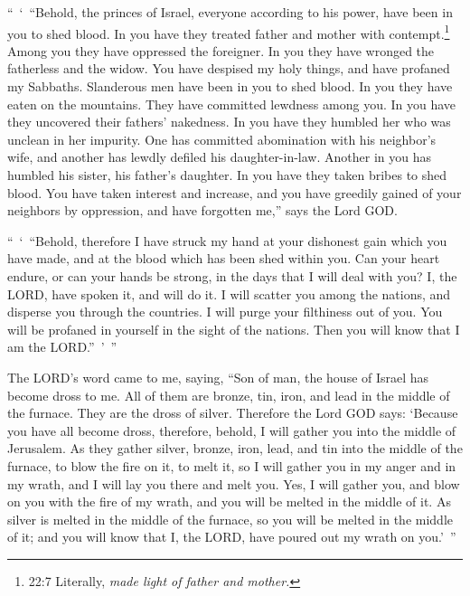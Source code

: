 \myverse{}“ ‘ “Behold, the princes of Israel, everyone according to his power,
have been in you to shed blood.
\myverse{}In you have they treated father and mother with contempt.\footnote{22:7 Literally,
	\textit{made light of father and mother.}} Among you they have oppressed the foreigner. In you
they have wronged the fatherless and the widow.
\myverse{}You have despised my holy things, and have profaned my Sabbaths.
\myverse{}Slanderous men have been in you to shed blood. In you they have eaten on the
mountains. They have committed lewdness among you.
\myverse{}In you have they uncovered their fathers’ nakedness. In you have they humbled
her who was unclean in her impurity.
\myverse{}One has committed abomination with his neighbor’s wife, and another has lewdly
defiled his daughter-in-law. Another in you has humbled his sister, his father’s daughter.
\myverse{}In you have they taken bribes to shed blood. You have taken interest and
increase, and you have greedily gained of your neighbors by oppression, and have forgotten me,” says the
Lord GOD.


\myverse{}“ ‘ “Behold, therefore I have struck my hand at your dishonest
gain which you have made, and at the blood which has been shed within you.
\myverse{}Can your heart endure, or can your hands be strong, in the days that I will
deal with you? I, the LORD, have spoken it, and will do it.
\myverse{}I will scatter you among the nations, and disperse you through the countries.
I will purge your filthiness out of you.
\myverse{}You will be profaned in yourself in the sight of the nations. Then you will
know that I am the LORD.” ’ ”


\myverse{}The LORD’s word came to me, saying,
\myverse{}“Son of man, the house of Israel has become dross to me. All of them are
bronze, tin, iron, and lead in the middle of the furnace. They are the dross of silver.
\myverse{}Therefore the Lord GOD says: ‘Because you have all become dross, therefore,
behold, I will gather you into the middle of Jerusalem.
\myverse{}As they gather silver, bronze, iron, lead, and tin into the middle of the
furnace, to blow the fire on it, to melt it, so I will gather you in my anger and in my wrath, and I will
lay you there and melt you.
\myverse{}Yes, I will gather you, and blow on you with the fire of my wrath, and you
will be melted in the middle of it.
\myverse{}As silver is melted in the middle of the furnace, so you will be melted in
the middle of it; and you will know that I, the LORD, have poured out my wrath on you.’ ”


